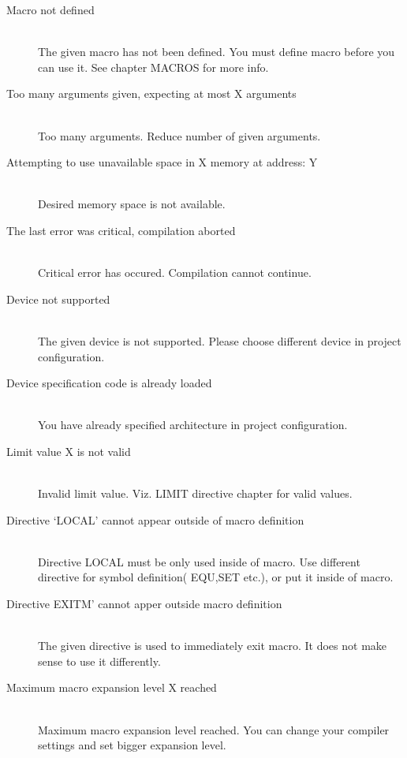 \begin{description}
                    \item[Macro not defined ] \hfill \\
                    The given macro has not been defined. You must define macro before you can use it. See chapter MACROS for more info.
                    \item[Too many arguments given, expecting at most X arguments] \hfill \\
                    Too many arguments. Reduce number of given arguments.
                    \item[Attempting to use unavailable space in X memory at address: Y ] \hfill \\
                    Desired memory space is not available.
                    \item[The last error was critical, compilation aborted] \hfill \\
                    Critical error has occured. Compilation cannot continue.
                    \item[Device not supported] \hfill \\
                    The given device is not supported. Please choose different device in project configuration.
                    \item[Device specification code is already loaded ] \hfill \\
                    You have already specified architecture in project configuration.
                    \item[Limit value X is not valid] \hfill \\
                    Invalid limit value. Viz. LIMIT directive chapter for valid values.
                    \item[Directive `LOCAL' cannot appear outside of macro definition ] \hfill \\
                    Directive LOCAL must be only used inside of macro. Use different directive for symbol definition( EQU,SET etc.), or put it inside of macro.
                    \item[Directive EXITM' cannot apper outside macro definition] \hfill \\
                    The given directive is used to immediately exit macro. It does not make sense to use it differently.
                    \item[Maximum macro expansion level X reached  ] \hfill \\
                    Maximum macro expansion level reached. You can change your compiler settings and set bigger expansion level.

\end{description}
